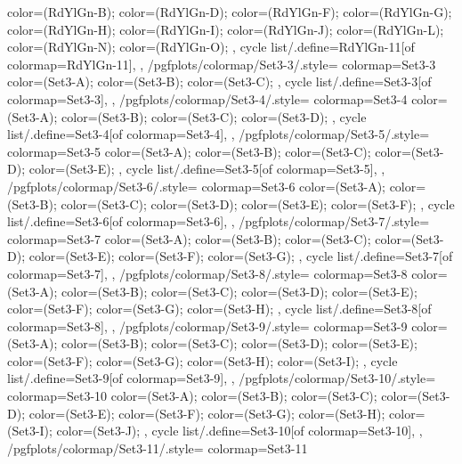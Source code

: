 {{{      color=(RdYlGn-B);
      color=(RdYlGn-D);
      color=(RdYlGn-F);
      color=(RdYlGn-G);
      color=(RdYlGn-H);
      color=(RdYlGn-I);
      color=(RdYlGn-J);
      color=(RdYlGn-L);
      color=(RdYlGn-N);
      color=(RdYlGn-O);
    },
    cycle list/.define={RdYlGn-11}{[of colormap=RdYlGn-11]},
  },
  /pgfplots/colormap/Set3-3/.style={
    colormap={Set3-3}{
      color=(Set3-A);
      color=(Set3-B);
      color=(Set3-C);
    },
    cycle list/.define={Set3-3}{[of colormap=Set3-3]},
  },
  /pgfplots/colormap/Set3-4/.style={
    colormap={Set3-4}{
      color=(Set3-A);
      color=(Set3-B);
      color=(Set3-C);
      color=(Set3-D);
    },
    cycle list/.define={Set3-4}{[of colormap=Set3-4]},
  },
  /pgfplots/colormap/Set3-5/.style={
    colormap={Set3-5}{
      color=(Set3-A);
      color=(Set3-B);
      color=(Set3-C);
      color=(Set3-D);
      color=(Set3-E);
    },
    cycle list/.define={Set3-5}{[of colormap=Set3-5]},
  },
  /pgfplots/colormap/Set3-6/.style={
    colormap={Set3-6}{
      color=(Set3-A);
      color=(Set3-B);
      color=(Set3-C);
      color=(Set3-D);
      color=(Set3-E);
      color=(Set3-F);
    },
    cycle list/.define={Set3-6}{[of colormap=Set3-6]},
  },
  /pgfplots/colormap/Set3-7/.style={
    colormap={Set3-7}{
      color=(Set3-A);
      color=(Set3-B);
      color=(Set3-C);
      color=(Set3-D);
      color=(Set3-E);
      color=(Set3-F);
      color=(Set3-G);
    },
    cycle list/.define={Set3-7}{[of colormap=Set3-7]},
  },
  /pgfplots/colormap/Set3-8/.style={
    colormap={Set3-8}{
      color=(Set3-A);
      color=(Set3-B);
      color=(Set3-C);
      color=(Set3-D);
      color=(Set3-E);
      color=(Set3-F);
      color=(Set3-G);
      color=(Set3-H);
    },
    cycle list/.define={Set3-8}{[of colormap=Set3-8]},
  },
  /pgfplots/colormap/Set3-9/.style={
    colormap={Set3-9}{
      color=(Set3-A);
      color=(Set3-B);
      color=(Set3-C);
      color=(Set3-D);
      color=(Set3-E);
      color=(Set3-F);
      color=(Set3-G);
      color=(Set3-H);
      color=(Set3-I);
    },
    cycle list/.define={Set3-9}{[of colormap=Set3-9]},
  },
  /pgfplots/colormap/Set3-10/.style={
    colormap={Set3-10}{
      color=(Set3-A);
      color=(Set3-B);
      color=(Set3-C);
      color=(Set3-D);
      color=(Set3-E);
      color=(Set3-F);
      color=(Set3-G);
      color=(Set3-H);
      color=(Set3-I);
      color=(Set3-J);
    },
    cycle list/.define={Set3-10}{[of colormap=Set3-10]},
  },
  /pgfplots/colormap/Set3-11/.style={
    colormap={Set3-11}{
}}}
